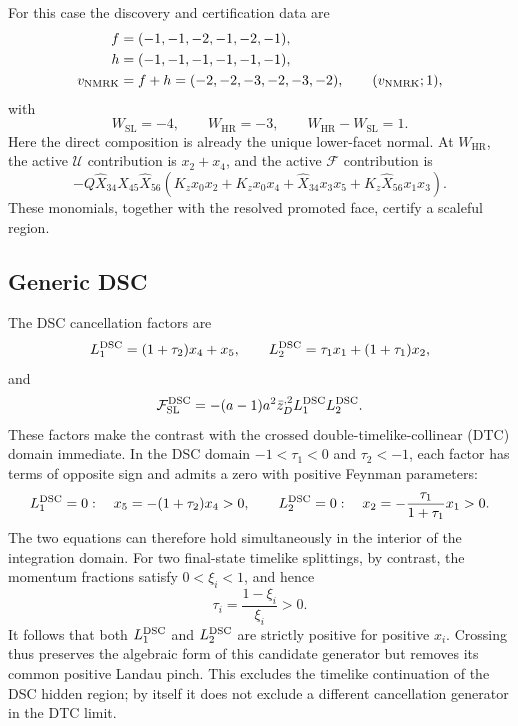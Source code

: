 \documentclass[11pt]{article}
\newcommand{\F}{\mathcal F}
\newcommand{\U}{\mathcal U}
\newcommand{\SL}{\mathrm{SL}}
\newcommand{\HR}{\mathrm{HR}}
\newcommand{\hX}{\widehat X}
\begin{document}
For this case the discovery and certification data are
\begin{align}
 f&=(-1,-1,-2,-1,-2,-1),\nonumber\\
 h&=(-1,-1,-1,-1,-1,-1),\nonumber\\
 v_{\rm NMRK}&=f+h=(-2,-2,-3,-2,-3,-2),
 \qquad (v_{\rm NMRK};1),
 \label{eq:nmrk-vector}
\end{align}
with
\begin{equation}
 W_{\SL}=-4,\qquad W_{\HR}=-3,\qquad
 W_{\HR}-W_{\SL}=1.
 \label{eq:nmrk-gap}
\end{equation}
Here the direct composition is already the unique lower-facet normal.  At
\(W_{\HR}\), the active \(\U\) contribution is \(x_2+x_4\), and the active
\(\F\) contribution is
\begin{equation}
 -Q\hX_{34}X_{45}\hX_{56}
 (K_zx_0x_2+K_zx_0x_4+\hX_{34}x_3x_5
 +K_z\hX_{56}x_1x_3).
 \label{eq:nmrk-whr}
\end{equation}
These monomials, together with the resolved promoted face, certify a scaleful
region.

\subsection{Generic DSC}

The DSC cancellation factors are
\begin{equation}
 L_1^{\rm DSC}=(1+\tau_2)x_4+x_5,\qquad
 L_2^{\rm DSC}=\tau_1x_1+(1+\tau_1)x_2,
 \label{eq:dsc-factors}
\end{equation}
and
\begin{equation}
 \F_{\SL}^{\rm DSC}=
 -(a-1)a^2\bar z_D^{,2}L_1^{\rm DSC}L_2^{\rm DSC}.
 \label{eq:dsc-fsl}
\end{equation}
These factors make the contrast with the crossed double-timelike-collinear
(DTC) domain immediate.  In the DSC domain
\(-1<\tau_1<0\) and \(\tau_2<-1\), each factor has terms of opposite sign
and admits a zero with positive Feynman parameters:
\begin{equation}
 L_1^{\rm DSC}=0:\quad
 x_5=-(1+\tau_2)x_4>0,
 \qquad
 L_2^{\rm DSC}=0:\quad
 x_2=-\frac{\tau_1}{1+\tau_1}x_1>0.
 \label{eq:dsc-positive-pinch}
\end{equation}
The two equations can therefore hold simultaneously in the interior of the
integration domain.  For two final-state timelike splittings, by contrast,
the momentum fractions satisfy \(0<\xi_i<1\), and hence
\begin{equation}
 \tau_i=\frac{1-\xi_i}{\xi_i}>0.
 \label{eq:dtc-tau-domain}
\end{equation}
It follows that both \(L_1^{\rm DSC}\) and \(L_2^{\rm DSC}\) are strictly
positive for positive \(x_i\).  Crossing thus preserves the algebraic form
of this candidate generator but removes its common positive Landau pinch.
This excludes the timelike continuation of the DSC hidden region; by itself
it does not exclude a different cancellation generator in the DTC limit.
\end{document}
